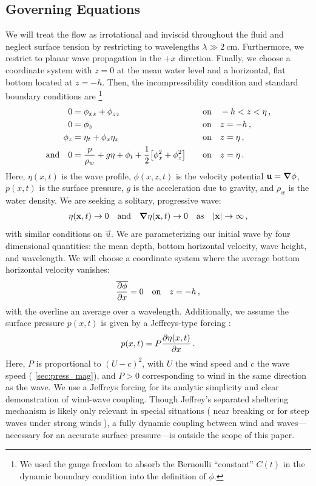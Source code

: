 \documentclass{jfm}
\begin{document}
\subsection{Governing Equations}
We will treat the flow as irrotational and inviscid throughout the
fluid and neglect surface tension by restricting to wavelengths $\lambda
\gg \SI{2}{\centi\meter}$.
Furthermore, we restrict to planar wave propagation in the $+x$
direction.
Finally, we choose a coordinate system with $z=0$ at the mean water level and
a horizontal, flat bottom located at $z=-h$.
Then, the incompressibility condition and standard boundary conditions
are%
\footnote{
  We used the gauge freedom to absorb the Bernoulli ``constant'' $C(t)$
  in the dynamic boundary condition into the definition of $\phi$.
}
\begin{alignat}{2}
  0 &= \phi_{xx} + \phi_{zz} &&\qq{on}
  -h < z < \eta \,, \label{eq:laplace}\\
  0 &= \phi_{z} &&\qq{on} z=-h \,, \label{eq:bottom_bc}\\
  \phi_{z} &= \eta_{t} + \phi_{x} \eta_{x} &&\qq{on} z = \eta \,,
  \label{eq:kinematic_bc}\\
  \qq*{and} 0 &= \frac{p}{\rho_w} + g\eta + \phi_{t} +
  \frac{1}{2} \bqty{\phi_{x}^2 + \phi_{z}^2} &&\qq{on} z=
  \eta \,. \label{eq:dynamic_bc}
\end{alignat}
Here, $\eta(x,t)$ is the wave profile, $\phi(x,z,t)$ is the velocity
potential $\mathbf{\bm{u}} = \grad{\phi}$, $p(x,t)$ is the surface pressure,
$g$ is the acceleration due to gravity, and $\rho_w$ is the water
density.
We are seeking a solitary, progressive wave:
\begin{gather}
  \eta(\vec{x},t) \to 0 \qq{and} \grad{\eta(\vec{x},t)} \to 0 \qq{as}
  \abs{\vec{x}} \to \infty \,,
\end{gather}
with similar conditions on $\vec{u}$.
We are parameterizing our initial wave by four dimensional quantities:
the mean depth, bottom horizontal velocity, wave height, and wavelength.
We will choose a coordinate system where the average bottom horizontal
velocity vanishes:
\begin{equation}
  \overline{ \pdv{\phi}{x} } = 0 \qq{on} z=-h \,,
  \label{eq:bot_bc_horz}
\end{equation}
with the overline an average over a wavelength.
Additionally, we assume the surface pressure $p(x,t)$ is given by a
Jeffreys-type forcing \citep{jeffreys1925formation}:
\begin{equation}
  p(x,t) = P \pdv{\eta(x,t)}{x} \,.
\end{equation}
Here, $P$ is proportional to $(U-c)^2$, with $U$ the wind speed and $c$
the wave speed (\cf{} \cref{sec:press_mag}), and $P>0$ corresponding to
wind in the same direction as the wave.
We use a Jeffreys forcing for its analytic simplicity and clear
demonstration of wind-wave coupling.
Though Jeffrey's separated sheltering mechanism is likely only relevant
in special situations (\eg{} near breaking
\citealp{banner1976separation} or for steep waves under strong winds
\citealp{tian2013evolution,touboul2006interaction}),
a fully dynamic coupling between wind and waves---necessary for an
accurate surface pressure---is outside the scope of this paper.
\end{document}
